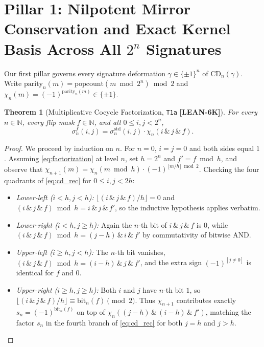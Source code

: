 \documentclass[11pt,reqno]{amsart}
\theoremstyle{plain}
\newtheorem{theorem}{Theorem}[section]
\theoremstyle{definition}
\theoremstyle{remark}
\newcommand{\tagLean}{\mbox{\textsf{\textbf{\color{oiBlue}[LEAN-6K]}}}}
\newcommand{\CD}{\mathrm{CD}}
\newcommand{\N}{\mathbb{N}}
\newcommand{\std}{\mathrm{std}}
\newcommand{\pop}{\mathrm{popcount}}
\newcommand{\parbit}{\mathrm{parity}}
\begin{document}
\section{Pillar 1: Nilpotent Mirror Conservation and Exact Kernel Basis Across All $2^n$ Signatures}
\label{sec:pillar1}

Our first pillar governs every signature deformation $\gamma \in \{\pm 1\}^n$ of $\CD_n(\gamma)$.
Write $\parbit_n(m) = \pop(m \bmod 2^n) \bmod 2$ and $\chi_n(m) = (-1)^{\parbit_n(m)} \in \{\pm 1\}$.

\begin{theorem}[Multiplicative Cocycle Factorization, \texttt{T1a} \tagLean]
\label{thm:t1a}
For every $n \in \N$, every flip mask $f \in \N$, and all $0 \le i, j < 2^n$,
\begin{equation}
\label{eq:factorization}
  \sigma_n^{f}(i, j) = \sigma_n^{\std}(i, j) \cdot \chi_n(i \,\&\, j \,\&\, f).
\end{equation}
\end{theorem}

\begin{proof}
We proceed by induction on $n$. For $n = 0$, $i = j = 0$ and both sides equal $1$. Assuming
\eqref{eq:factorization} at level $n$, set $h = 2^n$ and $f' = f \bmod h$, and observe that
$\chi_{n+1}(m) = \chi_n(m \bmod h)\cdot (-1)^{\lfloor m / h \rfloor \bmod 2}$. Checking the
four quadrants of \eqref{eq:cd_rec} for $0 \le i, j < 2h$:
\begin{itemize}[leftmargin=2em]
  \item \emph{Lower-left ($i < h, j < h$):} $\lfloor (i \,\&\, j \,\&\, f)/h \rfloor = 0$ and
    $(i \,\&\, j \,\&\, f) \bmod h = i \,\&\, j \,\&\, f'$, so the inductive hypothesis applies verbatim.
  \item \emph{Lower-right ($i < h, j \ge h$):} Again the $n$-th bit of $i \,\&\, j \,\&\, f$ is $0$,
    while $(i \,\&\, j \,\&\, f) \bmod h = (j - h) \,\&\, i \,\&\, f'$ by commutativity of bitwise AND.
  \item \emph{Upper-left ($i \ge h, j < h$):} The $n$-th bit vanishes, $(i \,\&\, j \,\&\, f) \bmod h
    = (i - h) \,\&\, j \,\&\, f'$, and the extra sign $(-1)^{[j \neq 0]}$ is identical for $f$ and $0$.
  \item \emph{Upper-right ($i \ge h, j \ge h$):} Both $i$ and $j$ have $n$-th bit $1$, so
    $\lfloor (i \,\&\, j \,\&\, f)/h \rfloor \equiv \mathrm{bit}_n(f) \pmod 2$. Thus $\chi_{n+1}$
    contributes exactly $s_n = (-1)^{\mathrm{bit}_n(f)}$ on top of $\chi_n((j-h)\,\&\,(i-h)\,\&\,f')$,
    matching the factor $s_n$ in the fourth branch of \eqref{eq:cd_rec} for both $j = h$ and $j > h$.\qedhere
\end{itemize}
\end{proof}
\end{document}
